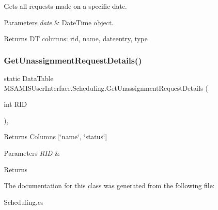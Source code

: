Gets all requests made on a specific date. 


\begin{DoxyParams}{Parameters}
{\em date} & Date\+Time object.\\
\hline
\end{DoxyParams}
\begin{DoxyReturn}{Returns}
DT columns\+: rid, name, dateentry, type
\end{DoxyReturn}
\mbox{\label{class_m_s_a_m_i_s_user_interface_1_1_scheduling_a764ffe5264eec3f9128d114ccceb83fb}} 
\subsubsection{\texorpdfstring{Get\+Unassignment\+Request\+Details()}{GetUnassignmentRequestDetails()}}
{\footnotesize\ttfamily static Data\+Table M\+S\+A\+M\+I\+S\+User\+Interface.\+Scheduling.\+Get\+Unassignment\+Request\+Details (\begin{DoxyParamCaption}\item[{int}]{R\+ID }\end{DoxyParamCaption})\hspace{0.3cm}{\ttfamily [inline]}, {\ttfamily [static]}}



Returns Columns \mbox{[}\char`\"{}name\char`\"{}, \char`\"{}status\char`\"{}\mbox{]} 


\begin{DoxyParams}{Parameters}
{\em R\+ID} & \\
\hline
\end{DoxyParams}
\begin{DoxyReturn}{Returns}

\end{DoxyReturn}


The documentation for this class was generated from the following file\+:\begin{DoxyCompactItemize}
\item 
Scheduling.\+cs\end{DoxyCompactItemize}
